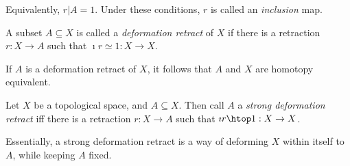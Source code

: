 \documentclass{fkbook}
\theoremstyle{snazzydefinition}
\begin{document}
\begin{adjustwidth}{1em}{1em}
\begin{definition}
    Equivalently, $r | A = 1$. Under these conditions, $r$ is called
    an \emph{inclusion} map.
  \end{definition}
  \begin{definition}
    A subset $A \subseteq X$ is called a \emph{deformation retract} of
    $X$ if there is a retraction $r : X \to A$ such that $\imath r
    \simeq 1 : X \to X$.
  \end{definition}
  If $A$ is a deformation retract of $X$, it follows that $A$ and $X$
  are homotopy equivalent.
  \begin{definition}
    Let $X$ be a topological space, and $A \subseteq X$. Then call $A$
    a \emph{strong deformation retract} iff there is a retraction $r :
    X \to A$ such that $\imath r \htop 1 : X \to X$.
  \end{definition}
  Essentially, a strong deformation retract is a way of deforming $X$
  within itself to $A$, while keeping $A$ fixed.
\end{adjustwidth}
\end{document}
